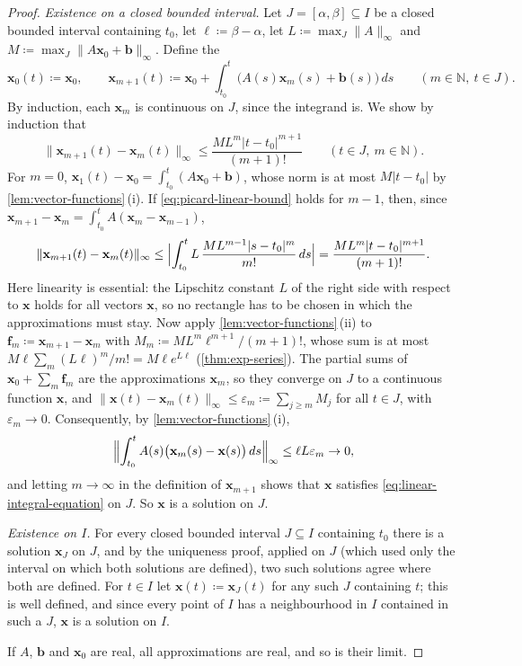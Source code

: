 \begin{proof}
\emph{Existence on a closed bounded interval.} Let $J=[\alpha,\beta]\subseteq I$ be a closed bounded interval containing $t_0$, let $\ell\coloneqq\beta-\alpha$, let $L\coloneqq\max_J\|A\|_\infty$ and $M\coloneqq\max_J\|A\mathbf x_0+\mathbf b\|_\infty$. Define the 
\[
\mathbf x_0(t)\coloneqq\mathbf x_0,\qquad\mathbf x_{m+1}(t)\coloneqq\mathbf x_0+\int_{t_0}^t\bigl(A(s)\mathbf x_m(s)+\mathbf b(s)\bigr)\,ds\qquad(m\in\mathbb N,\ t\in J).
\]
By induction, each $\mathbf x_m$ is continuous on $J$, since the integrand is. We show by induction that
\begin{equation}
\|\mathbf x_{m+1}(t)-\mathbf x_m(t)\|_\infty\le\frac{ML^m|t-t_0|^{m+1}}{(m+1)!}\qquad(t\in J,\ m\in\mathbb N).
\label{eq:picard-linear-bound}
\end{equation}
For $m=0$, $\mathbf x_1(t)-\mathbf x_0=\int_{t_0}^t(A\mathbf x_0+\mathbf b)$, whose norm is at most $M|t-t_0|$ by \cref{lem:vector-functions}\,(i). If \eqref{eq:picard-linear-bound} holds for $m-1$, then, since $\mathbf x_{m+1}-\mathbf x_m=\int_{t_0}^tA(\mathbf x_m-\mathbf x_{m-1})$,
\[
\|\mathbf x_{m+1}(t)-\mathbf x_m(t)\|_\infty\le\Bigl|\int_{t_0}^tL\,\frac{ML^{m-1}|s-t_0|^m}{m!}\,ds\Bigr|=\frac{ML^m|t-t_0|^{m+1}}{(m+1)!} .
\]
Here linearity is essential: the Lipschitz constant $L$ of the right side with respect to $\mathbf x$ holds for all vectors $\mathbf x$, so no rectangle has to be chosen in which the approximations must stay. Now apply \cref{lem:vector-functions}\,(ii) to $\mathbf f_m\coloneqq\mathbf x_{m+1}-\mathbf x_m$ with $M_m\coloneqq ML^m\ell^{m+1}/(m+1)!$, whose sum is at most $M\ell\sum_m(L\ell)^m/m!=M\ell e^{L\ell}$ (\cref{thm:exp-series}). The partial sums of $\mathbf x_0+\sum_m\mathbf f_m$ are the approximations $\mathbf x_m$, so they converge on $J$ to a continuous function $\mathbf x$, and $\|\mathbf x(t)-\mathbf x_m(t)\|_\infty\le\varepsilon_m\coloneqq\sum_{j\ge m}M_j$ for all $t\in J$, with $\varepsilon_m\to0$. Consequently, by \cref{lem:vector-functions}\,(i),
\[
\Bigl\|\int_{t_0}^tA(s)\bigl(\mathbf x_m(s)-\mathbf x(s)\bigr)\,ds\Bigr\|_\infty\le\ell L\varepsilon_m\to0 ,
\]
and letting $m\to\infty$ in the definition of $\mathbf x_{m+1}$ shows that $\mathbf x$ satisfies \eqref{eq:linear-integral-equation} on $J$. So $\mathbf x$ is a solution on $J$.

\emph{Existence on $I$.} For every closed bounded interval $J\subseteq I$ containing $t_0$ there is a solution $\mathbf x_J$ on $J$, and by the uniqueness proof, applied on $J$ (which used only the interval on which both solutions are defined), two such solutions agree where both are defined. For $t\in I$ let $\mathbf x(t)\coloneqq\mathbf x_J(t)$ for any such $J$ containing $t$; this is well defined, and since every point of $I$ has a neighbourhood in $I$ contained in such a $J$, $\mathbf x$ is a solution on $I$.

If $A$, $\mathbf b$ and $\mathbf x_0$ are real, all approximations are real, and so is their limit.
\end{proof}

